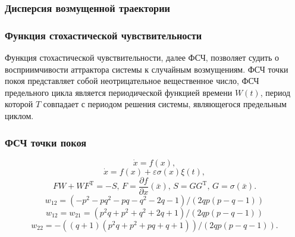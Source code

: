 \documentclass[slidestop,compress,mathserif]{beamer}
\newcommand\ddfrac[2]{\frac{\displaystyle #1}{\displaystyle #2}}
\begin{document}
\begin{frame}
\frametitle{Дисперсия возмущенной траектории}
\begin{figure}[h!]
\vspace{-1em}
\vspace{-2em}
\end{figure}
\end{frame}
\begin{frame}
\frametitle{Функция стохастической чувствительности}
\vspace{2.5em}
Функция стохастической чувствительности, далее ФСЧ, позволяет судить о восприимчивости аттрактора системы к случайным возмущениям. ФСЧ точки покоя представляет собой неотрицательное вещественное число, ФСЧ предельного цикла является периодической функцией времени $W(t)$, период которой $T$ совпадает с периодом решения системы, являющегося предельным циклом.
\end{frame}
\begin{frame}
\frametitle{ФСЧ точки покоя}
\vspace{-2.5em}
$$\dot{x} = f(x),$$
$$\dot{x} = f(x)+\varepsilon \sigma (x) \xi (t),$$
$$F W + W F^\mathrm{T} = -S,\, F = \ddfrac{\partial f}{\partial x}(\bar{x}),\, S = GG^\mathrm{T},\, G = \sigma(\bar{x}).$$
\vspace{0.2em}
$$w_{1 2} = (-p^2-p q^2-p q-q^2-2 q-1)/(2 q p (p-q-1))$$
$$w_{1 2} = w_{2 1} = (p^2q+p^2+q^2+2q+1)/(2qp(p-q-1))$$
$$ w_{2 2} = -((q+1)(p^2q+p^2+pq+q+1))/(2qp(p-q-1)).$$
\end{frame}
\end{document}
